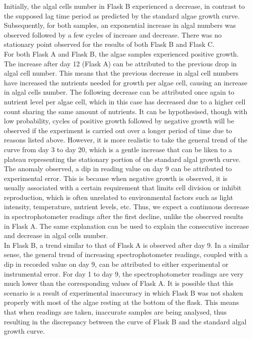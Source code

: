 \documentclass[12pt,a4paper]{IEEEtran}
\begin{document}
    Initially, the algal cells number in Flask B experienced a decrease, in contrast to the supposed lag time period as predicted by the standard algae growth curve. Subsequently, for both samples, an exponential
    increase in algal numbers was observed followed by a few cycles of increase and decrease. There was no stationary point observed for the results of both Flask B and Flask C. \\
    
    For both Flask A and Flask B, the algae samples experienced positive growth. \\
    
    The increase after day 12 (Flask A) can be attributed to the previous drop in algal cell number. This means that the previous decrease in algal cell numbers have increased the nutrients needed for growth per
    algae cell, causing an increase in algal cells number. The following decrease can be attributed once again to nutrient level per algae cell, which in this case has decreased due to a higher cell count sharing the same amount of nutrients. It can be hypothesised, though with low probability, cycles of positive growth followed by negative growth will be observed if the experiment is carried out over a longer period of time due to reasons listed above. However, it is more realistic to take the general trend of the curve from day 3 to day 20, which is a gentle increase that can be liken to a plateau representing the stationary portion of the standard algal growth curve. The anomaly observed, a dip in reading value on day 9 can be attributed to experimental error. This is because when negative growth is observed, it is usually associated with a certain requirement that limits cell division or inhibit reproduction, which is often unrelated to environmental factors such as light intensity, temperature, nutrient levels, etc. Thus, we expect a continuous decrease in spectrophotometer readings after the first decline, unlike the observed results in Flask A. The same explanation can be used to explain the consecutive increase and decrease in algal cells number. \\ 
    
    In Flask B, a trend similar to that of Flask A is observed after day 9. In a similar sense, the general trend of increasing spectrophotometer readings, coupled with a dip in recorded value on day 9, can be attributed to either experimental or instrumental error. For day 1 to day 9, the spectrophotometer readings are very much lower than the corresponding values of Flask A. It is possible that this scenario is a result of experimental inaccuracy in which Flask B was not shaken properly with most of the algae resting at the bottom of the flask. This means that when readings are taken, inaccurate samples are being analysed, thus resulting in the discrepancy between the curve of Flask B and the standard algal growth curve. \\
    
\end{document}
